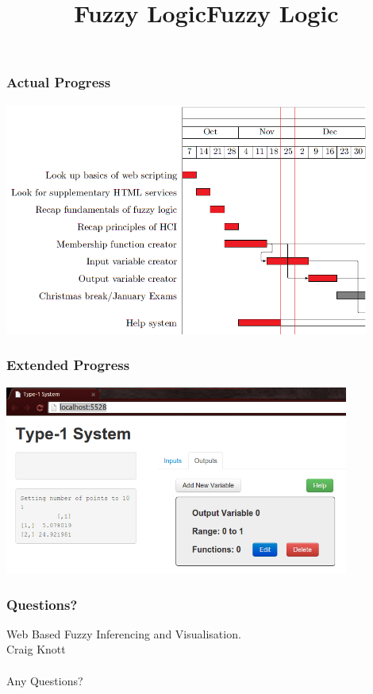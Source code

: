 \documentclass{beamer}
\begin{document}
\title{Fuzzy Logic}
\begin{frame}
 \frametitle{Actual Progress}
 \begin{center}
 \includegraphics[width=0.9\textwidth]{images/GANTTTWO.png}
 \end{center}
\end{frame}

\begin{frame}
 \frametitle{Extended Progress}
 \begin{mdframed}
 \begin{center}
 \includegraphics[width=0.85\textwidth]{images/fuz11b.png}
 \end{center} 
 \end{mdframed}
\end{frame}

\title{Fuzzy Logic}
\begin{frame}
 \frametitle{Questions?}
 \begin{center}
  Web Based Fuzzy Inferencing and Visualisation.\ \\
 Craig Knott\ \\

 \ \\
 Any Questions?
 \end{center}
\end{frame}
\end{document}
